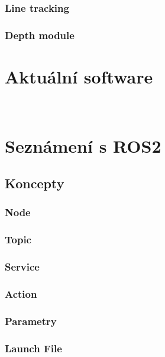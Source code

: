 \subsubsection*{Line tracking}

\subsubsection*{Depth module}


\section{Aktuální software}

\



\section{Seznámení s ROS2}


\subsection*{Koncepty}

\subsubsection*{Node}

\subsubsection*{Topic}

\subsubsection*{Service}

\subsubsection*{Action}

\subsubsection*{Parametry}

\subsubsection*{Launch File}

